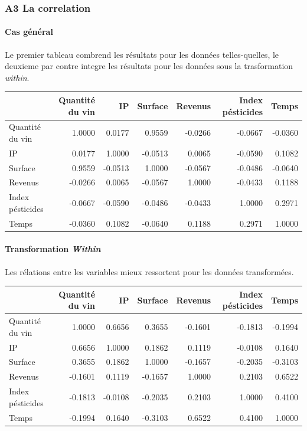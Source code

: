 \documentclass[11pt,]{article}
\let\oldparagraph\paragraph
\renewcommand{\paragraph}[1]{\oldparagraph{#1}\mbox{}}
\begin{document}
\hypertarget{a3-la-correlation}{%
\subsubsection{A3 La correlation}\label{a3-la-correlation}}

\hypertarget{cas-general-1}{%
\paragraph{Cas général}\label{cas-general-1}}

Le premier tableau combrend les résultats pour les données
telles-quelles, le deuxieme par contre integre les résultats pour les
données sous la trasformation \emph{within}.

\FloatBarrier

\begin{longtable}[]{@{}lrrrrrr@{}}
\toprule
& Quantité du vin & IP & Surface & Revenus & Index pésticides &
Temps\tabularnewline
\midrule
\endhead
Quantité du vin & 1.0000 & 0.0177 & 0.9559 & -0.0266 & -0.0667 &
-0.0360\tabularnewline
IP & 0.0177 & 1.0000 & -0.0513 & 0.0065 & -0.0590 &
0.1082\tabularnewline
Surface & 0.9559 & -0.0513 & 1.0000 & -0.0567 & -0.0486 &
-0.0640\tabularnewline
Revenus & -0.0266 & 0.0065 & -0.0567 & 1.0000 & -0.0433 &
0.1188\tabularnewline
Index pésticides & -0.0667 & -0.0590 & -0.0486 & -0.0433 & 1.0000 &
0.2971\tabularnewline
Temps & -0.0360 & 0.1082 & -0.0640 & 0.1188 & 0.2971 &
1.0000\tabularnewline
\bottomrule
\end{longtable}

\FloatBarrier

\hypertarget{transformation-within-1}{%
\paragraph{\texorpdfstring{Transformation
\emph{Within}}{Transformation Within}}\label{transformation-within-1}}

Les rélations entre les variables mieux ressortent pour les données
transformées.

\FloatBarrier

\begin{longtable}[]{@{}lrrrrrr@{}}
\toprule
& Quantité du vin & IP & Surface & Revenus & Index pésticides &
Temps\tabularnewline
\midrule
\endhead
Quantité du vin & 1.0000 & 0.6656 & 0.3655 & -0.1601 & -0.1813 &
-0.1994\tabularnewline
IP & 0.6656 & 1.0000 & 0.1862 & 0.1119 & -0.0108 & 0.1640\tabularnewline
Surface & 0.3655 & 0.1862 & 1.0000 & -0.1657 & -0.2035 &
-0.3103\tabularnewline
Revenus & -0.1601 & 0.1119 & -0.1657 & 1.0000 & 0.2103 &
0.6522\tabularnewline
Index pésticides & -0.1813 & -0.0108 & -0.2035 & 0.2103 & 1.0000 &
0.4100\tabularnewline
Temps & -0.1994 & 0.1640 & -0.3103 & 0.6522 & 0.4100 &
1.0000\tabularnewline
\bottomrule
\end{longtable}
\end{document}
